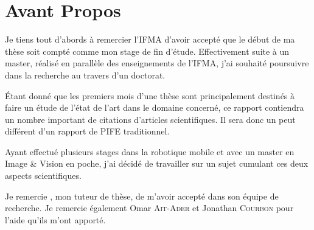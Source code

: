 \section*{Avant Propos}

Je tiens tout d'abords à remercier l'IFMA d'avoir accepté que le début de ma thèse soit compté comme mon stage de fin d'étude.
Effectivement suite à un master, réalisé en parallèle des enseignements de l'IFMA, j'ai souhaité poursuivre dans la recherche au travers d'un doctorat.

\'Etant donné que les premiers mois d'une thèse sont principalement destinés à faire un étude de l'état de l'art dans le domaine concerné, ce rapport contiendra un nombre important de citations d'articles scientifiques. Il sera donc un peut différent d'un rapport de PIFE traditionnel.

Ayant effectué plusieurs stages dans la robotique mobile et avec un master en Image \& Vision en poche, j'ai décidé de travailler sur un sujet cumulant ces deux aspects scientifiques.

Je remercie \tuteur, mon tuteur de thèse, de m'avoir accepté dans son équipe de recherche. Je remercie également Omar \textsc{Ait-Ader} et Jonathan \textsc{Courbon} pour l'aide qu'ils m'ont apporté.